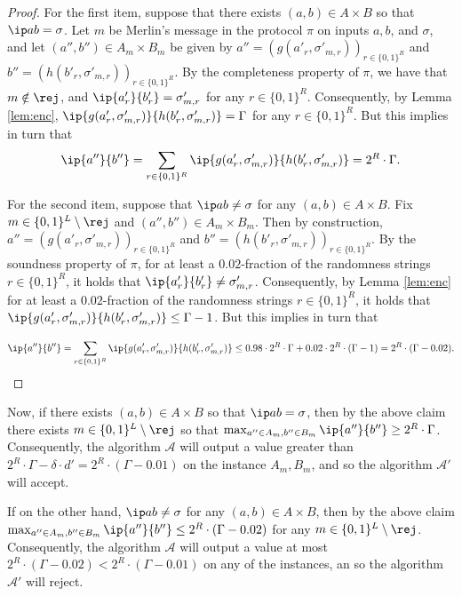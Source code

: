 \documentclass[11pt]{article}
\begin{document}
\begin{proof}
For the first item, suppose that there exists  $(a,b) \in A \times B$ so that $\ip a b =\sigma$. Let $m$ be Merlin's message in the protocol $\pi$ on inputs $a,b$, and $\sigma$, and let $(a'',b'') \in A_m \times B_m$ be given by
$a''=(g(a'_r, \sigma'_{m,r}))_{r \in \{0,1\}^R} $ and $b''=( h(b'_r, \sigma'_{m,r}))_{r \in \{0,1\}^R}$. By the completeness property of $\pi$, we have that $m \notin \rej$, and 
$\ip {a'_r} {b'_r} = \sigma'_{m,r}$ for any $r \in \{0,1\}^R$. Consequently, by Lemma \ref{lem:enc}, $\ip {g(a'_r, \sigma'_{m,r}) } 
{ h(b'_r, \sigma'_{m,r})} = \Gamma$ for any $r \in \{0,1\}^R$. But this implies in turn that
$$ \ip {a''} {b''} = \sum_{r \in \{0,1\}^R} \ip {g(a'_r, \sigma'_{m,r}) } { h(b'_r, \sigma'_{m,r})} = 2^R \cdot \Gamma.$$

For the second item, suppose that $\ip a b \neq \sigma$ for any $(a,b) \in A\times B$. Fix $m \in \{0,1\}^L \setminus \rej$ and 
$(a'',b'') \in A_m \times B_m$. Then by construction,  $a''=(g(a'_r, \sigma'_{m,r}))_{r \in \{0,1\}^R} $ and $b''=( h(b'_r, \sigma'_{m,r}))_{r \in \{0,1\}^R}$. By the soundness property of $\pi$, for at least a $0.02$-fraction of the randomness strings $r \in \{0,1\}^R$, it holds that $\ip {a'_r} {b'_r} \neq \sigma'_{m,r}$. Consequently, by Lemma \ref{lem:enc} for at least a $0.02$-fraction of the randomness strings $r \in \{0,1\}^R$, it holds that  $\ip {g(a'_r, \sigma'_{m,r}) } 
{ h(b'_r, \sigma'_{m,r})} \leq \Gamma -1$. But this implies in turn that 


$$\ip {a''} {b''}  =  \sum_{r \in \{0,1\}^R} \ip {g(a'_r, \sigma'_{m,r}) } { h(b'_r, \sigma'_{m,r})}  
 \leq  0.98 \cdot 2^R \cdot \Gamma + 0.02  \cdot 2^R\cdot (\Gamma -1) 
 =   2^R \cdot (\Gamma - 0.02)  .
 $$

\end{proof}

Now, if there exists $(a,b) \in A \times B$ so that $\ip a b =\sigma$, then by the above claim there exists $m \in \{0,1\}^L \setminus \rej$ so that $\max_{a'' \in A_m, b'' \in B_m} \ip {a''} {b''} \geq 2^R \cdot \Gamma$. Consequently, the algorithm $\mathcal A$ will output a value greater than $2^R \cdot \Gamma - \delta \cdot d' = 2^R \cdot (\Gamma - 0.01)$ on the instance $A_m,B_m$, and so the algorithm $\mathcal {A'}$ will accept.

If on the other hand, $\ip a b \neq \sigma$ for any $(a,b) \in A\times B$, then by the above claim $\max_{a'' \in A_m, b'' \in B_m} \ip {a''} {b''} \leq 2^R \cdot (\Gamma - 0.02)$ for any $m \in \{0,1\}^L \setminus \rej$. Consequently, the algorithm $\mathcal A$ will output a value at most $2^R \cdot (\Gamma - 0.02)<2^R \cdot (\Gamma - 0.01)$ on any of the instances, an so the algorithm 
$\mathcal{A}'$ will reject.
\end{document}
